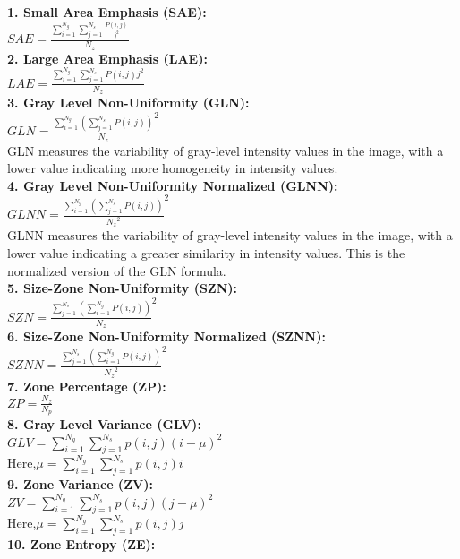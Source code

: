 \textbf{1. Small Area Emphasis (SAE):}\\
$SAE=\frac{\sum _{i=1}^{N_{g}}\sum _{j=1}^{N_{s}}\frac{P\left(i,j\right)}{j^{2}}}{N_{z}}$\\
\textbf{2. Large Area Emphasis (LAE):}\\
$LAE=\frac{\sum _{i=1}^{N_{g}}\sum _{j=1}^{N_{s}}P\left(i,j\right)j^{2}}{N_{z}}$\\
\textbf{3. Gray Level Non-Uniformity (GLN):}\\
$GLN=\frac{\sum _{i=1}^{N_{g}}\left(\sum _{j=1}^{N_{s}}P\left(i,j\right)\right)}{N_{z}}^{2}$\\
GLN measures the variability of gray-level intensity values in the image, with a lower value indicating more homogeneity in intensity values.\\
\textbf{4. Gray Level Non-Uniformity Normalized (GLNN):}\\
$GLNN=\frac{\sum _{i=1}^{N_{g}}\left(\sum _{j=1}^{N_{s}}P\left(i,j\right)\right)}{{N_{z}}^{2}}^{2}$\\
GLNN measures the variability of gray-level intensity values in the image, with a lower value indicating a greater similarity in intensity values. This is the normalized version of the GLN formula.\\
\textbf{5. Size-Zone Non-Uniformity (SZN):}\\
$SZN=\frac{\sum _{j=1}^{N_{s}}\left(\sum _{i=1}^{N_{g}}P\left(i,j\right)\right)}{N_{z}}^{2}$\\
\textbf{6. Size-Zone Non-Uniformity Normalized (SZNN):}\\
$SZNN=\frac{\sum _{j=1}^{N_{s}}\left(\sum _{i=1}^{N_{g}}P\left(i,j\right)\right)}{{N_{z}}^{2}}^{2}$\\
\textbf{7. Zone Percentage (ZP):}\\
$ZP=\frac{N_{z}}{N_{p}}$\\
\textbf{8. Gray Level Variance (GLV):}\\
$GLV=\sum _{i=1}^{N_{g}}\sum _{j=1}^{N_{s}}p\left(i,j\right)\left(i-\mu \right)^{2}$\\
Here,$\mu =\sum _{i=1}^{N_{g}}\sum _{j=1}^{N_{s}}p\left(i,j\right)i$\\
\textbf{9. Zone Variance (ZV):}\\
$ZV=\sum _{i=1}^{N_{g}}\sum _{j=1}^{N_{s}}p\left(i,j\right)\left(j-\mu \right)^{2}$\\
Here,$\mu =\sum _{i=1}^{N_{g}}\sum _{j=1}^{N_{s}}p\left(i,j\right)j$\\
\textbf{10. Zone Entropy (ZE):}\\
